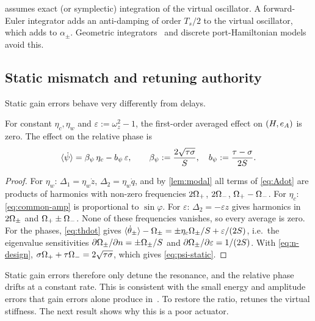 \begin{remark}
 assumes exact (or symplectic) integration of the virtual
oscillator.
A forward-Euler integrator adds an anti-damping of order $T_s/2$ to the virtual
oscillator, which adds to $\alpha_\pm$.
Geometric integrators~\citep{hairer2006geometric} and discrete port-Hamiltonian
models~\citep{stramigioli2005sampled} avoid this.
\end{remark}

\subsection{Static mismatch and retuning authority}\label{sec:authority}
Static gain errors behave very differently from delays.

\begin{proposition}\label{prop:static}
For constant $\eta_c,\eta_w$ and $\varepsilon:=\omega_z^2-1$, the first-order
averaged effect on $(H,e_A)$ is zero.
The effect on the relative phase is
\begin{equation}\label{eq:psi-static}
  \langle \dot\psi\rangle=\beta_\psi\,\eta_c-b_\psi\,\varepsilon,\qquad
  \beta_\psi:=\frac{2\sqrt{\tau\sigma}}{S},\quad b_\psi:=\frac{\tau-\sigma}{2S}.
\end{equation}
\end{proposition}
\begin{proof}
For $\eta_w$: $\Delta_1=\eta_w\dot z$, $\Delta_2=\eta_w\dot q$, and by
\cref{lem:modal} all terms of \eqref{eq:Adot} are products of
harmonics with non-zero frequencies $2\Omega_+$, $2\Omega_-$, $\Omega_+-\Omega_-$.
For $\eta_c$: \eqref{eq:common-amp} is proportional to $\sin\varphi$.
For $\varepsilon$: $\Delta_2=-\varepsilon z$ gives harmonics in $2\Omega_\pm$ and
$\Omega_+\pm\Omega_-$.
None of these frequencies vanishes, so every average is zero.
For the phases, \eqref{eq:thdot} gives
$\langle \dot\theta_\pm\rangle-\Omega_\pm=\pm\eta_c\Omega_\pm/S+\varepsilon/(2S)$, i.e.\ the
eigenvalue sensitivities $\partial\Omega_\pm/\partial n=\pm\Omega_\pm/S$ and
$\partial\Omega_\pm/\partial\varepsilon=1/(2S)$.
With \eqref{eq:n-design}, $\sigma\Omega_++\tau\Omega_-=2\sqrt{\tau\sigma}$, which gives
\eqref{eq:psi-static}.
\end{proof}

Static gain errors therefore only detune the resonance, and the relative phase
drifts at a constant rate.
This is consistent with the small energy and amplitude errors that gain errors
alone produce in~\citet[Table~I]{juchem2027restoring}.
To restore the ratio, \citet{juchem2027restoring} retunes the virtual stiffness.
The next result shows why this is a poor actuator.

